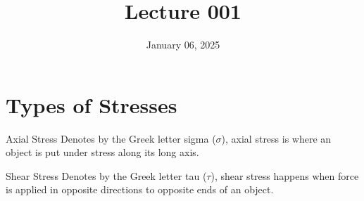 \documentclass[12pt]{article}
\title{Lecture 001}
\date{January 06, 2025}
\begin{document}
\section{Types of Stresses}
\label{sec:typesOfStresses}

\begin{definition}{Axial Stress}
Denotes by the Greek letter sigma ($\sigma$), axial stress is where an object is put under stress along its long axis.
\end{definition}

\begin{definition}{Shear Stress}
Denotes by the Greek letter tau ($\tau$), shear stress happens when force is applied in opposite directions to opposite ends of an object.
\end{definition}
\end{document}
